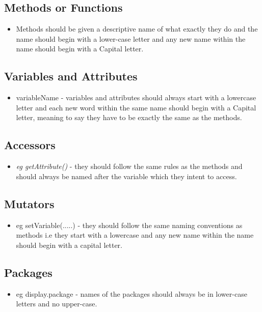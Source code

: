 \documentclass[12pt]{article}
\begin{document}
 \subsection{Methods or Functions}
  \begin{itemize}
 	\item Methods should be given a descriptive name of what exactly they do and the name should begin with a lower-case letter and any new name 	within the name should begin with a Capital letter.
 	\end{itemize} 
 	
 \subsection{Variables and Attributes} 
  \begin{itemize}
 	\item variableName - variables and attributes should always start with a lowercase letter and each new word within the same name should begin with a Capital letter, meaning to say they have to be exactly the same 	as the methods.
 	\end{itemize} 
 	
  \subsection{Accessors}
   \begin{itemize} 
 	 \item {\it eg getAttribute()} - they should follow the same rules as the methods and should always be named after the variable which they intent to access.
 	 \end{itemize} 
 	 
  \subsection{Mutators}
   \begin{itemize} 
 	 \item eg setVariable(.....) - they should follow the same naming conventions as methods i.e they start with a lowercase and any new name within the name should begin with a capital letter.
 	  \end{itemize} 
 	 
  \subsection{Packages} 
   \begin{itemize}
 	 \item eg display.package -  names of the packages should always be in lower-case letters and no upper-case.
 	 \end{itemize} 
 	 
\end{document}
